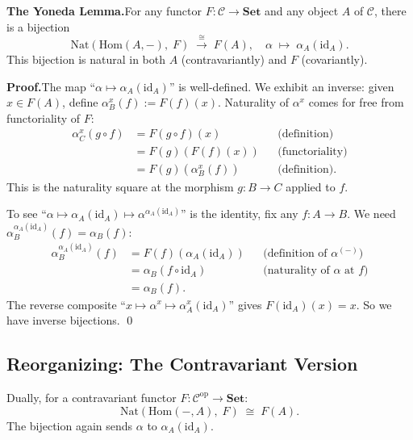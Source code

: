 \textbf{The Yoneda Lemma.}\quad For any functor $F : \mathcal{C} \to
\mathbf{Set}$ and any object $A$ of $\mathcal{C}$, there is a bijection
\begin{equation*}
  \boxed{\;
    \mathrm{Nat}(\mathrm{Hom}(A, -),\; F)
    \;\xrightarrow{\;\cong\;}\;
    F(A),
    \quad
    \alpha \;\mapsto\; \alpha_A(\mathrm{id}_A).
  \;}
\end{equation*}
This bijection is natural in both $A$ (contravariantly) and $F$ (covariantly).

\textbf{Proof.}\quad The map ``$\alpha \mapsto \alpha_A(\mathrm{id}_A)$''
is well-defined. We exhibit an inverse: given $x \in F(A)$, define
$\alpha^x_B(f) := F(f)(x)$. Naturality of $\alpha^x$ comes for free from
functoriality of $F$:
\begin{align*}
  \alpha^x_C(g \circ f)
    &= F(g \circ f)(x)
       && \text{(definition)} \\
    &= F(g)(F(f)(x))
       && \text{(functoriality)} \\
    &= F(g)(\alpha^x_B(f))
       && \text{(definition)}.
\end{align*}
This is the naturality square at the morphism $g : B \to C$ applied to
$f$.

To see ``$\alpha \mapsto \alpha_A(\mathrm{id}_A) \mapsto \alpha^{\alpha_A(\mathrm{id}_A)}$''
is the identity, fix any $f : A \to B$. We need
$\alpha^{\alpha_A(\mathrm{id}_A)}_B(f) = \alpha_B(f)$:
\begin{align*}
  \alpha^{\alpha_A(\mathrm{id}_A)}_B(f)
    &= F(f)(\alpha_A(\mathrm{id}_A))
       && \text{(definition of $\alpha^{(-)}$)} \\
    &= \alpha_B(f \circ \mathrm{id}_A)
       && \text{(naturality of $\alpha$ at $f$)} \\
    &= \alpha_B(f).
\end{align*}
The reverse composite ``$x \mapsto \alpha^x \mapsto \alpha^x_A(\mathrm{id}_A)$''
gives $F(\mathrm{id}_A)(x) = x$. So we have inverse bijections. \qed

\subsection{Reorganizing: The Contravariant Version}

Dually, for a contravariant functor $F : \mathcal{C}^{\mathrm{op}} \to
\mathbf{Set}$:
\begin{equation*}
  \mathrm{Nat}(\mathrm{Hom}(-, A),\; F) \;\cong\; F(A).
\end{equation*}
The bijection again sends $\alpha$ to $\alpha_A(\mathrm{id}_A)$.

